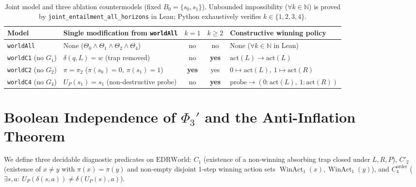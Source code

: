 \documentclass[10pt,a4paper]{article}
\theoremstyle{cleanthm}
\theoremstyle{cleandef}
\DeclareMathOperator{\WinAct}{WinAct}
\begin{document}
\begin{table}[!htbp]
\centering
\caption{Joint model and three ablation countermodels (fixed $B_0=\{s_0,s_1\}$). Unbounded impossibility ($\forall k\in\mathbb{N}$) is proved by \texttt{joint\_\allowbreak entailment\_\allowbreak all\_\allowbreak horizons} in Lean; Python exhaustively verifies $k\in\{1,2,3,4\}$.}
\label{tab:countermodels}
\small
\begin{tabularx}{\linewidth}{@{}l >{\raggedright\arraybackslash}X c c >{\raggedright\arraybackslash}X@{}}
\toprule
\textbf{Model} & \textbf{Single modification from \texttt{worldAll}} & \textbf{$k=1$} & \textbf{$k\ge 2$} & \textbf{Constructive winning policy} \\
\midrule
\texttt{worldAll} & None ($\Theta_0\land\Theta_1\land\Theta_2\land\Theta_4$) & no & no & None ($\forall k\in\mathbb{N}$ in Lean) \\
\texttt{worldC1} (no $G_1$) & $\delta(q,L)=w$ (trap removed) & no & \textbf{yes} & $\mathrm{act}(L)\to\mathrm{act}(L)$ \\
\texttt{worldC2} (no $G_2$) & $\pi=\pi_2$ ($\pi(s_0)=0,\ \pi(s_1)=1$) & \textbf{yes} & yes & $0\mapsto\mathrm{act}(L),\ 1\mapsto\mathrm{act}(R)$ \\
\texttt{worldC4} (no $G_4$) & $U_P(s_1)=s_1$ (non-destructive probe) & no & \textbf{yes} & $\mathrm{probe}\to(0:\mathrm{act}(L),\ 1:\mathrm{act}(R))$ \\
\bottomrule
\end{tabularx}
\end{table}

\section{Boolean Independence of \texorpdfstring{$\Phi_3'$}{Phi3'} and the Anti-Inflation Theorem}

We define three decidable diagnostic predicates on $\mathrm{EDRWorld}$: $C_1$ (existence of a non-winning absorbing trap closed under $L,R,P$), $C'_2$ (existence of $x\ne y$ with $\pi(x)=\pi(y)$ and non-empty disjoint 1-step winning action sets $\WinAct_1(x),\WinAct_1(y)$), and $C_4^{\mathrm{order}}$ ($\exists s,a:\ U_P(\delta(s,a))\ne\delta(U_P(s),a)$).
\end{document}
